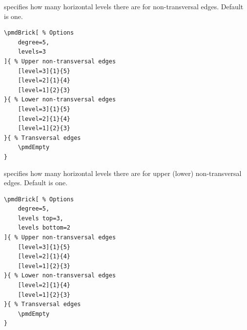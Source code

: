 \documentclass{ltxdoc}
\begin{document}
specifies how many horizontal levels there are for non-transversal edges. Default is one.
\begin{center}
    \begin{minipage}{\dimexpr0.85\textwidth-2\fboxrule-2\fboxsep\relax}
        \begin{minipage}[c]{0.4\linewidth}
\begin{verbatim}
\pmdBrick[ % Options
    degree=5,
    levels=3
]{ % Upper non-transversal edges
    [level=3]{1}{5}
    [level=2]{1}{4}
    [level=1]{2}{3}
}{ % Lower non-transversal edges
    [level=3]{1}{5}
    [level=2]{1}{4}
    [level=1]{2}{3}
}{ % Transversal edges
    \pmdEmpty
}
\end{verbatim}
        \end{minipage}
        \hfill
        \begin{minipage}[c]{0.4\linewidth}
        \end{minipage}
    \end{minipage}%
\end{center}

 
specifies how many horizontal levels there are for upper (lower) non-transversal edges. Default is one.
\begin{center}
    \begin{minipage}{\dimexpr0.85\textwidth-2\fboxrule-2\fboxsep\relax}
        \begin{minipage}[c]{0.4\linewidth}
\begin{verbatim}
\pmdBrick[ % Options
    degree=5,
    levels top=3,
    levels bottom=2
]{ % Upper non-transversal edges
    [level=3]{1}{5}
    [level=2]{1}{4}
    [level=1]{2}{3}
}{ % Lower non-transversal edges
    [level=2]{1}{4}
    [level=1]{2}{3}
}{ % Transversal edges
    \pmdEmpty
}
\end{verbatim}
        \end{minipage}
        \hfill
        \begin{minipage}[c]{0.4\linewidth}
        \end{minipage}
    \end{minipage}%
\end{center}
\end{document}
